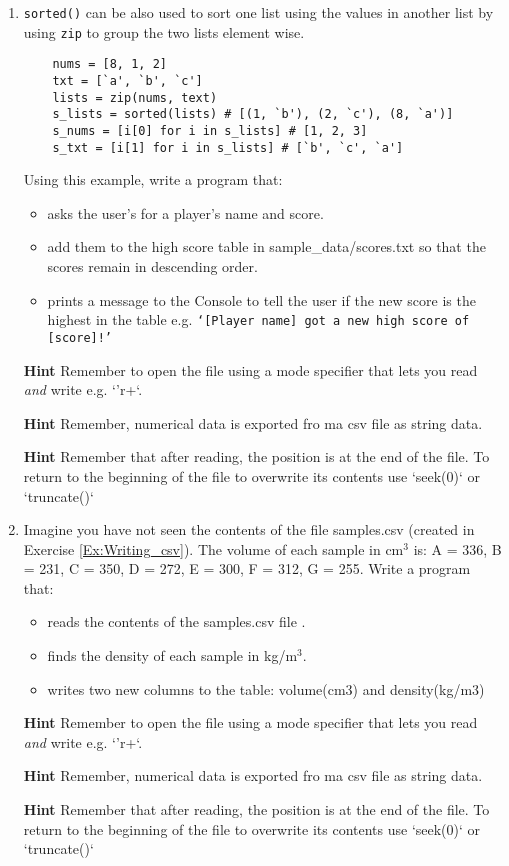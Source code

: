 \documentclass[11pt]{report}
\begin{document}
\begin{enumerate}[label=(\Alph*)]
    
    \item {\tt sorted()} can be also used to sort one list using the values in another list by using {\tt zip} to group the two lists element wise.
    \vspace{0.5 em}
    \begin{verbatim}
    nums = [8, 1, 2]
    txt = [`a', `b', `c']
    lists = zip(nums, text) 
    s_lists = sorted(lists) # [(1, `b'), (2, `c'), (8, `a')]
    s_nums = [i[0] for i in s_lists] # [1, 2, 3]
    s_txt = [i[1] for i in s_lists] # [`b', `c', `a']
    \end{verbatim}

    Using this example, write a program that:
    \begin{itemize}
        \item asks the user's for a player's name and score.
        \item add them to the high score table in sample\_data/scores.txt so that the scores remain in descending order.
        \item prints a message to the Console to tell the user if the new score is the highest in the table e.g. {\tt `[Player name] got a new high score of [score]!'} 
    \end{itemize}
    
    {\bf Hint} Remember to open the file using a mode specifier that lets you read {\it and} write e.g. `'r+`.
    
    {\bf Hint} Remember, numerical data is exported fro ma  csv file as string data. 
    
    {\bf Hint} Remember that after reading, the position is at the end of the file. To return to the beginning of the file to overwrite its contents use `seek(0)` or `truncate()`
    
    \item  Imagine you have not seen the contents of the file samples.csv (created in Exercise \ref{Ex:Writing_csv}). The volume of each sample in cm$^3$ is: A = 336, B = 231, C = 350, D = 272, E = 300, F = 312, G = 255. Write a program that:
    {\begin{itemize}
        \item reads the contents of the samples.csv file .
        \item finds the density of each sample in kg/m$^3$.
        \item writes two new columns to the table: volume(cm3) and density(kg/m3)
    \end{itemize}} 
    
{\bf Hint} Remember to open the file using a mode specifier that lets you read {\it and} write e.g. `'r+`.
    
    {\bf Hint} Remember, numerical data is exported fro ma  csv file as string data. 
    
    {\bf Hint} Remember that after reading, the position is at the end of the file. To return to the beginning of the file to overwrite its contents use `seek(0)` or `truncate()`
    
\end{enumerate}
\end{document}
